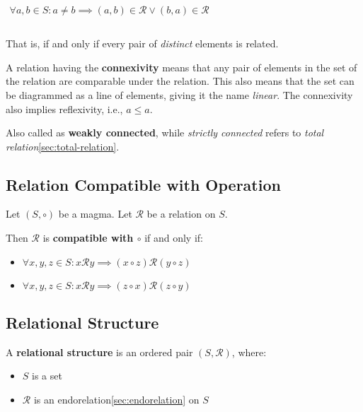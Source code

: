 \begin{math}
  \begin{array}{c}
    \\
    \forall a, b \in S: a \neq b \implies (a, b) \in \mathcal{R} \lor (b,a) \in \mathcal{R} \\
    \\
  \end{array}
\end{math}


That is, if and only if every pair of \textit{distinct} elements is
related.


A relation having the \textbf{connexivity} means that any pair of
elements in the set of the relation are comparable under the
relation. This also means that the set can be diagrammed as a line of
elements, giving it the name \textit{linear}. The connexivity also
implies reflexivity, i.e., $a \leq a$.

Also called as \textbf{weakly connected}, while \textit{strictly
  connected} refers to \textit{total
  relation}\ref{sec:total-relation}.


\subsection{Relation Compatible with Operation}
\label{sec:compatibility}

Let $(S, \circ)$ be a magma. Let $\mathcal{R}$ be a relation on $S$.

Then $\mathcal{R}$ is \textbf{compatible with $\circ$} if and only if:

\begin{itemize}
\item $\forall x, y, z \in S: x \mathcal{R} y \implies (x \circ z) \mathcal{R} (y \circ z)$
\item $\forall x, y, z \in S: x \mathcal{R} y \implies (z \circ x) \mathcal{R} (z \circ y)$
\end{itemize}


\subsection{Relational Structure}
\label{sec:relational-structure}

A \textbf{relational structure} is an ordered pair $(S, \mathcal{R})$,
where:

\begin{itemize}
\item $S$ is a set
\item $\mathcal{R}$ is an endorelation\ref{sec:endorelation} on $S$
\end{itemize}

